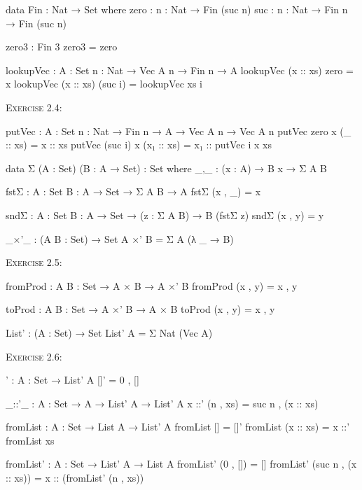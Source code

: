 \documentclass{article}
\begin{document}
\begin{code}
data Fin : Nat → Set where
    zero : {n : Nat} → Fin (suc n)
    suc : {n : Nat} → Fin n → Fin (suc n)

zero3 : Fin 3
zero3 = zero

lookupVec : {A : Set} {n : Nat} → Vec A n → Fin n → A
lookupVec (x :: xs) zero = x
lookupVec (x :: xs) (suc i) = lookupVec xs i
\end{code}

\noindent
\textsc{Exercise 2.4}:

\begin{code}
putVec : {A : Set} {n : Nat} → Fin n → A → Vec A n → Vec A n
putVec zero x (_ :: xs) = x :: xs
putVec (suc i) x (x₁ :: xs) = x₁ :: putVec i x xs
\end{code}

\begin{code}
data Σ (A : Set) (B : A → Set) : Set where
    _,_ : (x : A) → B x → Σ A B

fstΣ : {A : Set} {B : A → Set} → Σ A B → A
fstΣ (x , _) = x

sndΣ : {A : Set} {B : A → Set} → (z : Σ A B) → B (fstΣ z)
sndΣ (x , y) = y

_×'_ : (A B : Set) → Set
A ×' B = Σ A (λ _ → B)
\end{code}

\noindent
\textsc{Exercise 2.5}:

\begin{code}
fromProd : {A B : Set} → A × B → A ×' B
fromProd (x , y) = x , y

toProd : {A B : Set} → A ×' B → A × B
toProd (x , y) = x , y
\end{code}

\begin{code}
List' : (A : Set) → Set
List' A = Σ Nat (Vec A)
\end{code}

\noindent
\textsc{Exercise 2.6}:

\begin{code}
[]' : {A : Set} → List' A
[]' = 0 , []

_::'_ : {A : Set} → A → List' A → List' A
x ::' (n , xs) = suc n , (x :: xs)

fromList : {A : Set} → List A → List' A
fromList [] = []'
fromList (x :: xs) = x ::' fromList xs

fromList' : {A : Set} → List' A → List A
fromList' (0 , []) = []
fromList' (suc n , (x :: xs)) = x :: (fromList' (n , xs))
\end{code}
\end{document}
